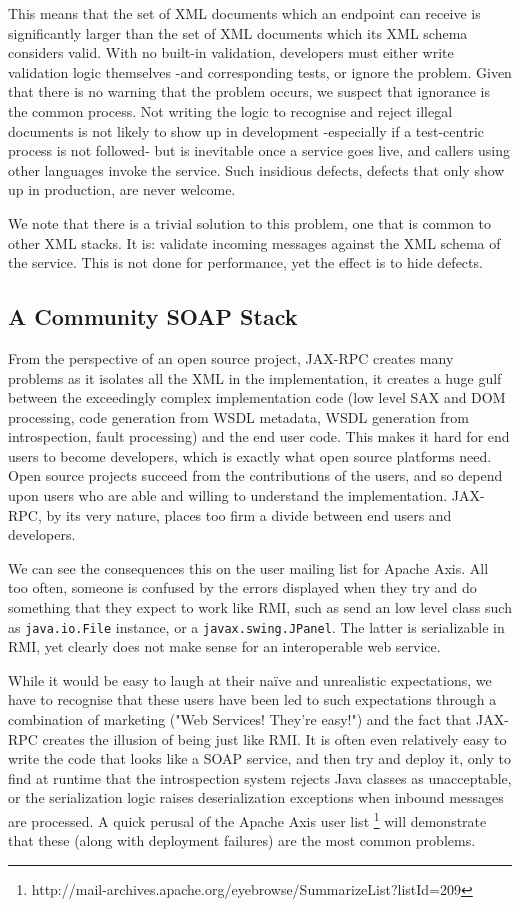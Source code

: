 This means that the set of XML documents which an endpoint can
receive is significantly larger than the set of XML documents which
its XML schema considers valid. With no built-in
validation, developers must either write validation logic themselves
-and corresponding tests, or ignore the problem. Given that there is
no warning that the problem occurs, we suspect that ignorance is the
common process. Not writing the logic to recognise and reject illegal
documents is not likely to show up in development -especially if a
test-centric process is not followed- but is inevitable once a service
goes live, and callers using other languages invoke the service. Such
insidious defects, defects that only show up in production, are never
welcome.

We note that there is a trivial solution to this problem, one that is
common to other XML stacks. It is: validate incoming messages against
the XML schema of the service. This is not done for performance, yet
the effect is to hide defects.


\subsection{A Community SOAP Stack}
\label{alpine:community}
From the perspective of an open source project, JAX-RPC creates
many problems as it isolates all the XML in the implementation, it
creates a huge gulf between the exceedingly complex implementation
code (low level SAX and DOM processing, code generation from WSDL
metadata, WSDL generation from introspection, fault processing) and
the end user code.  This makes it hard for end users to become
developers, which is exactly what open source platforms need. Open
source projects succeed from the contributions of the users, and so
depend upon users who are able and willing to understand the
implementation. JAX-RPC, by its very nature, places too firm a divide
between end users and developers.

We can see the consequences this on the user mailing list for Apache
Axis. All too often, someone is confused by the errors displayed when
they try and do something that they expect to work like RMI, such as
send an low level class such as \verb|java.io.File| instance, or a
\verb|javax.swing.JPanel|. The latter is serializable in RMI, yet
clearly does not make sense for an interoperable web service.

While it would be easy to laugh at their na\"{i}ve and unrealistic
expectations, we have to recognise that these users have been led to
such expectations through a combination of marketing ("Web Services!
They're easy!") and the fact that JAX-RPC creates the illusion of
being just like RMI. It is often even relatively easy to write the
code that looks like a SOAP service, and then try and deploy it, only
to find at runtime that the introspection system rejects Java classes
as unacceptable, or the serialization logic raises deserialization
exceptions when inbound messages are processed. A quick perusal of the
Apache Axis user list
\footnote{http://mail-archives.apache.org/eyebrowse/SummarizeList?listId=209}
will demonstrate that these (along with deployment failures) are the
most common problems.

